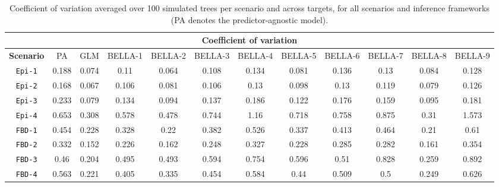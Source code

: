 \begin{landscape}
    \begin{table}[h!]
        \centering
        \begin{tabular}{cccccccccccc}
            \toprule

            \multicolumn{12}{c}{\textbf{Coefficient of variation}}                                                                                                                                                                                                                                                                                                      \\
            \midrule

            \textbf{Scenario} & PA                     & GLM                     & BELLA-1                     & BELLA-2                     & BELLA-3                     & BELLA-4                     & BELLA-5                     & BELLA-6                     & BELLA-7                     & BELLA-8                     & BELLA-9                     \\
            \midrule

            \texttt{Epi-1}    & 0.188   & 0.074   & 0.11   & 0.064   & 0.108   & 0.134   & 0.081   & 0.136   & 0.13   & 0.084   & 0.128   \\[6pt]

            \texttt{Epi-2}    & 0.168   & 0.067   & 0.106   & 0.081   & 0.106   & 0.13   & 0.098   & 0.13   & 0.119   & 0.079   & 0.126   \\[6pt]

            \texttt{Epi-3}    & 0.233   & 0.079   & 0.134   & 0.094   & 0.137   & 0.186   & 0.122   & 0.176   & 0.159   & 0.095   & 0.181   \\[6pt]

            \texttt{Epi-4}    & 0.653   & 0.308   & 0.578   & 0.478   & 0.744   & 1.16   & 0.718   & 0.758   & 0.875   & 0.31   & 1.573   \\[6pt]

            \texttt{FBD-1}    & 0.454 & 0.228 & 0.328 & 0.22 & 0.382 & 0.526 & 0.337 & 0.413 & 0.464 & 0.21 & 0.61 \\[6pt]

            \texttt{FBD-2}    & 0.332 & 0.152 & 0.226 & 0.162 & 0.248 & 0.327 & 0.228 & 0.285 & 0.282 & 0.161 & 0.354 \\[6pt]

            \texttt{FBD-3}    & 0.46 & 0.204 & 0.495 & 0.493 & 0.594 & 0.754 & 0.596 & 0.51 & 0.828 & 0.259 & 0.892 \\[6pt]

            \texttt{FBD-4}    & 0.563     & 0.221     & 0.405     & 0.335     & 0.454     & 0.584     & 0.44     & 0.509     & 0.5     & 0.249     & 0.626     \\[6pt]

            \bottomrule
        \end{tabular}
        \caption{Coefficient of variation averaged over 100 simulated trees per scenario and across targets, for all scenarios and inference frameworks (PA denotes the predictor-agnostic model). }%
        \label{tab:cv}
    \end{table}
\end{landscape}
